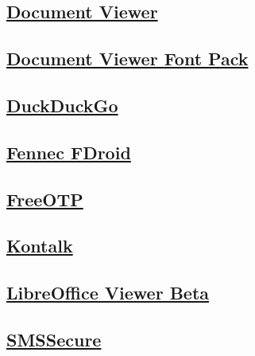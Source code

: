 \subsection{\href{https://f-droid.org/repository/browse/?fdcategory=Reading&fdid=org.sufficientlysecure.viewer}
{Document Viewer}}

\subsection{\href{https://f-droid.org/repository/browse/?fdcategory=Reading&fdid=org.sufficientlysecure.viewer.fontpack}
{Document Viewer Font Pack}}

\subsection{\href{https://f-droid.org/repository/browse/?fdcategory=Internet&fdid=com.duckduckgo.mobile.android&fdpage=2}
{DuckDuckGo}}

\subsection{\href{https://f-droid.org/repository/browse/?fdid=org.mozilla.fennec_fdroid}
{Fennec FDroid}}

\subsection{\href{https://f-droid.org/repository/browse/?fdcategory=System&fdid=org.fedorahosted.freeotp&fdpage=4}
{FreeOTP}}

\subsection{\href{https://f-droid.org/repository/browse/?fdcategory=Internet&fdid=org.kontalk&fdpage=3}
{Kontalk}}

\subsection{\href{https://f-droid.org/repository/browse/?fdcategory=Office&fdid=com.collabora.libreoffice&fdpage=6}
{LibreOffice Viewer Beta}}

\subsection{\href{https://f-droid.org/repository/browse/?fdcategory=Phone+26+SMS&fdid=org.smssecure.smssecure&fdpage=2}
{SMSSecure}}

